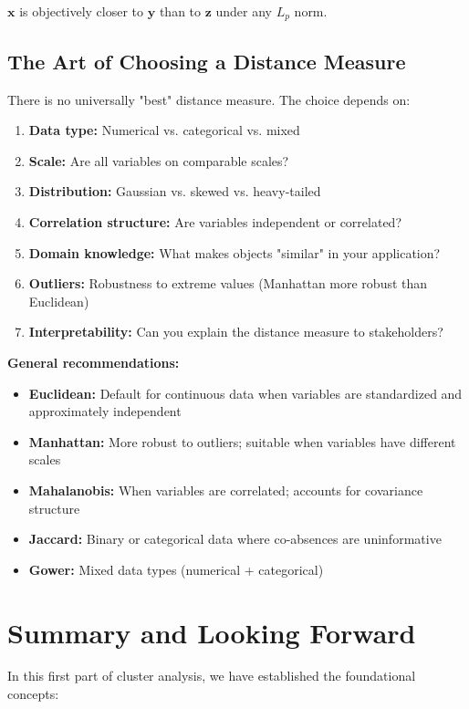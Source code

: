 \documentclass[11pt]{article}
\begin{document}
$\mathbf{x}$ is objectively closer to $\mathbf{y}$ than to $\mathbf{z}$ under any $L_p$ norm.

\subsection{The Art of Choosing a Distance Measure}

There is no universally "best" distance measure. The choice depends on:

\begin{enumerate}
    \item \textbf{Data type:} Numerical vs. categorical vs. mixed
    \item \textbf{Scale:} Are all variables on comparable scales?
    \item \textbf{Distribution:} Gaussian vs. skewed vs. heavy-tailed
    \item \textbf{Correlation structure:} Are variables independent or correlated?
    \item \textbf{Domain knowledge:} What makes objects "similar" in your application?
    \item \textbf{Outliers:} Robustness to extreme values (Manhattan more robust than Euclidean)
    \item \textbf{Interpretability:} Can you explain the distance measure to stakeholders?
\end{enumerate}

\textbf{General recommendations:}
\begin{itemize}
    \item \textbf{Euclidean:} Default for continuous data when variables are standardized and approximately independent
    \item \textbf{Manhattan:} More robust to outliers; suitable when variables have different scales
    \item \textbf{Mahalanobis:} When variables are correlated; accounts for covariance structure
    \item \textbf{Jaccard:} Binary or categorical data where co-absences are uninformative
    \item \textbf{Gower:} Mixed data types (numerical + categorical)
\end{itemize}

\section{Summary and Looking Forward}

In this first part of cluster analysis, we have established the foundational concepts:
\end{document}
